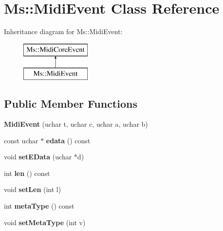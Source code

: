 \hypertarget{class_ms_1_1_midi_event}{}\section{Ms\+:\+:Midi\+Event Class Reference}
\label{class_ms_1_1_midi_event}
Inheritance diagram for Ms\+:\+:Midi\+Event\+:\begin{figure}[H]
\begin{center}
\leavevmode
\includegraphics[height=2.000000cm]{class_ms_1_1_midi_event}
\end{center}
\end{figure}
\subsection*{Public Member Functions}
\begin{DoxyCompactItemize}
\item 
\mbox{\label{class_ms_1_1_midi_event_a397f878b7374db26e256c666e3bdabd5}} 
{\bfseries Midi\+Event} (uchar t, uchar c, uchar a, uchar b)
\item 
\mbox{\label{class_ms_1_1_midi_event_aafce8105f7bb775b19982124bd24db7e}} 
const uchar $\ast$ {\bfseries edata} () const
\item 
\mbox{\label{class_ms_1_1_midi_event_a65e0c117dbb39ebd6ead464aa286f04e}} 
void {\bfseries set\+E\+Data} (uchar $\ast$d)
\item 
\mbox{\label{class_ms_1_1_midi_event_aec1f427cf30c92e72123769e5cd00bff}} 
int {\bfseries len} () const
\item 
\mbox{\label{class_ms_1_1_midi_event_a03d12b3f62e6a66d0cd9ca4d061c1fcf}} 
void {\bfseries set\+Len} (int l)
\item 
\mbox{\label{class_ms_1_1_midi_event_a8680314a1f4ff2bc9a3f7d2ca73e1bb1}} 
int {\bfseries meta\+Type} () const
\item 
\mbox{\label{class_ms_1_1_midi_event_a22083a300040776c6118433e9822c3b8}} 
void {\bfseries set\+Meta\+Type} (int v)
\end{DoxyCompactItemize}
